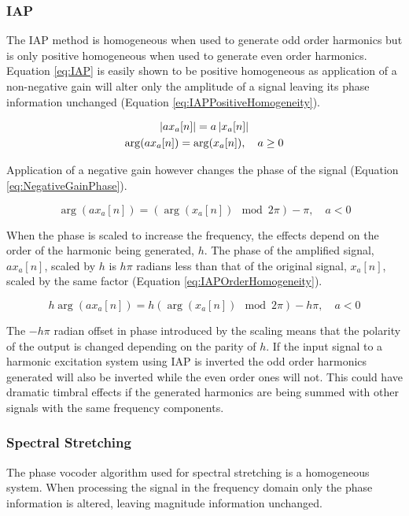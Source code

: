 		\subsubsection*{IAP}
			The IAP method is homogeneous when used to generate odd order harmonics but is only positive
			homogeneous when used to generate even order harmonics. Equation \ref{eq:IAP} is easily shown to be
			positive homogeneous as application of a non-negative gain will alter only the amplitude of a
			signal leaving its phase information unchanged (Equation \ref{eq:IAPPositiveHomogeneity}).

			\begin{gather}
				\left|ax_{a}[n]\right| = a\left|x_{a}[n]\right| \nonumber \\
				\arg(ax_{a}[n]) = \arg(x_{a}[n]), \quad a \geq 0
				\label{eq:IAPPositiveHomogeneity}
			\end{gather}

			Application of a negative gain however changes the phase of the signal (Equation
			\ref{eq:NegativeGainPhase}).
						
			\begin{equation}
				\arg(ax_{a}[n]) = (\arg(x_{a}[n]) \mod 2\pi) - \pi, \quad a < 0
				\label{eq:NegativeGainPhase}
			\end{equation}

			When the phase is scaled to increase the frequency, the effects depend on the order of the harmonic
			being generated, $h$. The phase of the amplified signal, $ax_{a}[n]$, scaled by $h$ is $h\pi$
			radians less than that of the original signal, $x_{a}[n]$, scaled by the same factor (Equation
			\ref{eq:IAPOrderHomogeneity}).

			\begin{equation}
				h\arg(ax_{a}[n]) = h(\arg(x_{a}[n]) \mod 2\pi) - h\pi, \quad a < 0
				\label{eq:IAPOrderHomogeneity}
			\end{equation}

			The $-h\pi$ radian offset in phase introduced by the scaling means that the polarity of the output
			is changed depending on the parity of $h$. If the input signal to a harmonic excitation system
			using IAP is inverted the odd order harmonics generated will also be inverted while the even order
			ones will not. This could have dramatic timbral effects if the generated harmonics are being summed
			with other signals with the same frequency components.

		\subsubsection*{Spectral Stretching}
			The phase vocoder algorithm used for spectral stretching is a homogeneous system. When processing
			the signal in the frequency domain only the phase information is altered, leaving magnitude
			information unchanged. 

